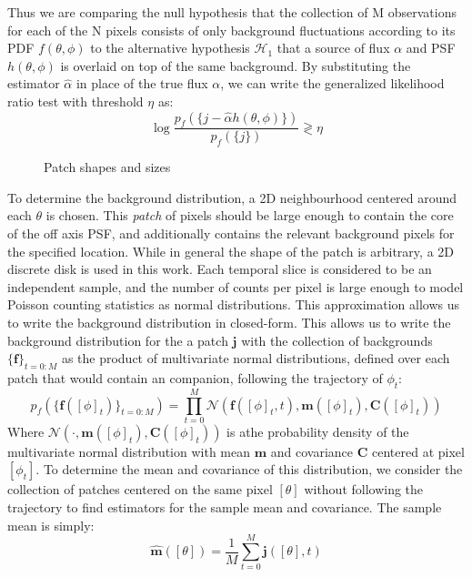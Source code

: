 \documentclass[twocolumn,fleqn]{aastex62}
\begin{document}
Thus we are comparing the null hypothesis that the collection of M observations for each of the N pixels consists of only background fluctuations according to its PDF $f(\theta,\phi)$ to the alternative hypothesis $\mathcal{H}_{1}$ that a source of flux $\alpha$ and PSF $h(\theta,\phi)$ is overlaid on top of the same background. 
By substituting the estimator $\hat{\alpha}$ in place of the true flux $\alpha$, we can write the generalized likelihood ratio test with threshold $\eta$ as:
\begin{equation}\label{eqn:ll}
\log\frac{p_{f}(\{j - \hat{\alpha} h(\theta,\phi)\})}{p_{f}(\{j\})} \gtrless \eta
\end{equation}

\begin{figure}[h]
	\centering
	\caption{\label{fig:patch} Patch shapes and sizes}
\end{figure}

To determine the background distribution, a 2D neighbourhood centered around each $\theta$ is chosen.
This \textit{patch} of pixels should be large enough to contain the core of the off axis PSF, and additionally contains the relevant background pixels for the specified location.  
While in general the shape of the patch is arbitrary, a 2D discrete disk is used in this work.
Each temporal slice is considered to be an independent sample, and the number of counts per pixel is large enough to model Poisson counting statistics as normal distributions.
This approximation allows us to write the background distribution in closed-form.
This allows us to write the background distribution for the a patch $\mathbf{j}$ with the collection of backgrounds $\{\mathbf{f}\}_{t=0:M}$ as the product of multivariate normal distributions, defined over each patch that would contain an companion, following the trajectory of $\phi_{t}$:
\begin{equation}\label{eqn:mvg}
p_{f}\left(\{\mathbf{f}([\phi]_{t})\}_{t=0:M}\right) = \prod_{t = 0}^{M}\mathcal{N}\left(\mathbf{f}([\phi]_{t},t),\mathbf{m}([\phi]_{t}),\mathbf{C}([\phi]_{t})\right)
\end{equation}
Where $\mathcal{N}\left(\cdot,\mathbf{m}([\phi]_{t}),\mathbf{C}([\phi]_{t})\right)$ is athe probability density of the multivariate normal distribution with mean $\mathbf{m}$ and covariance $\mathbf{C}$ centered at pixel $[\phi_{t}]$.
To determine the mean and covariance of this distribution, we consider the collection of patches centered on the same pixel $[\theta]$ without following the trajectory to find estimators for the sample mean and covariance.
The sample mean is simply:
\begin{equation}
\hat{\mathbf{m}}([\theta]) = \frac{1}{M}\sum_{t=0}^{M}\mathbf{j}([\theta],t)
\end{equation}
\end{document}
